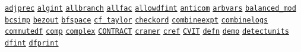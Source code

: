 \begin{list}{}
\doubleinterwordspace
\hyperlink{switch:ADJPREC}{\texttt{adjprec}}
\hyperlink{switch:ALGINT}{\texttt{algint}}
\hyperlink{switch:ALLBRANCH}{\texttt{allbranch}}
\hyperlink{switch:ALLFAC}{\texttt{allfac}}
\hyperlink{switch:ALLOWDFINT}{\texttt{allowdfint}}
\hyperlink{switch:ANTICOM}{\texttt{anticom}}
\hyperlink{switch:ARBVARS}{\texttt{arbvars}}
\hyperlink{switch:BALANCED_MOD}{\texttt{balanced\_mod}}
\hyperlink{switch:BCSIMP}{\texttt{bcsimp}}
\hyperlink{switch:BEZOUT}{\texttt{bezout}}
\hyperlink{switch:BFSPACE}{\texttt{bfspace}}
\hyperlink{switch:CF_TAYLOR}{\texttt{cf\_taylor}}
\hyperlink{switch:CHECKORD}{\texttt{checkord}}
\hyperlink{switch:COMBINEEXPT}{\texttt{combineexpt}}
\hyperlink{switch:COMBINELOGS}{\texttt{combinelogs}}
\hyperlink{switch:COMMUTEDF}{\texttt{commutedf}}
\hyperlink{switch:COMP}{\texttt{comp}}
\hyperlink{switch:COMPLEX}{\texttt{complex}}
\hyperlink{switch:CONTRACT}{\texttt{CONTRACT}}
\hyperlink{switch:CRAMER}{\texttt{cramer}}
\hyperlink{switch:CREF}{\texttt{cref}}
\hyperlink{switch:CVIT}{\texttt{CVIT}}
\hyperlink{switch:DEFN}{\texttt{defn}}
\hyperlink{switch:DEMO}{\texttt{demo}}
\hyperlink{switch:DETECTUNITS}{\texttt{detectunits}}
\hyperlink{switch:DFINT}{\texttt{dfint}}
\hyperlink{switch:DFPRINT}{\texttt{dfprint}}

\end{list}
